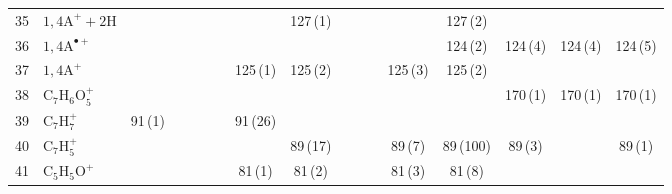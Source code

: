 \documentclass[]{article}
\begin{document}
\begin{table}
{\begin{tabular}{ll|ccccc|ccccc|ccccc}
  35 & $\mathrm{1{,}4A^+{+}2H}$ &  &  &  &  &  &  & 127\,(1) &  &  &  &  & 127\,(2) &  &  &  \\ 
  36 & $\mathrm{1{,}4A^{\bullet+}}$ &  &  &  &  &  &  &  &  &  &  &  & 124\,(2) & 124\,(4) & 124\,(4) & 124\,(5) \\ 
  37 & $\mathrm{1{,}4A^+}$ &  &  &  &  &  & 125\,(1) & 125\,(2) &  &  &  & 125\,(3) & 125\,(2) &  &  &  \\ 
  38 & $\mathrm{C_{7}H_{6}O_{5}^+}$ &  &  &  &  &  &  &  &  &  &  &  &  & 170\,(1) & 170\,(1) & 170\,(1) \\ 
  39 & $\mathrm{C_{7}H_{7}^+}$ & 91\,(1) &  &  &  &  & 91\,(26) &  &  &  &  &  &  &  &  &  \\ 
  40 & $\mathrm{C_{7}H_{5}^+}$ &  &  &  &  &  &  & 89\,(17) &  &  &  & 89\,(7) & 89\,(100) & 89\,(3) &  & 89\,(1) \\ 
  41 & $\mathrm{C_{5}H_{5}O^+}$ &  &  &  &  &  & 81\,(1) & 81\,(2) &  &  &  & 81\,(3) & 81\,(8) &  &  &  \\ 
   \bottomrule
\end{tabular}
}
\end{table}
\end{document}
